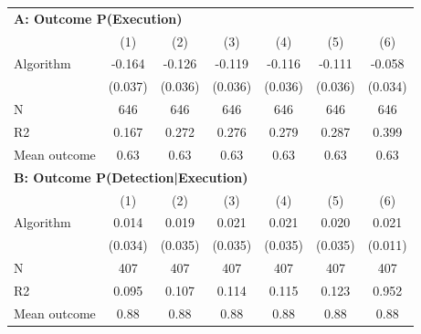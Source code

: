 \begin{tabular}{lcccccc} \toprule
\multicolumn{7}{l}{\textbf{A: Outcome P(Execution)}} \\ \multicolumn{1}{l}{} & (1) & (2) & (3) & (4) & (5) & (6) \\ \midrule
Algorithm   &      -0.164\sym{***}&      -0.126\sym{***}&      -0.119\sym{***}&      -0.116\sym{***}&      -0.111\sym{***}&      -0.058\sym{*}  \\
            &     (0.037)         &     (0.036)         &     (0.036)         &     (0.036)         &     (0.036)         &     (0.034)         \\
\midrule
N           &         646         &         646         &         646         &         646         &         646         &         646         \\
R2          &       0.167         &       0.272         &       0.276         &       0.279         &       0.287         &       0.399         \\
Mean outcome&        0.63         &        0.63         &        0.63         &        0.63         &        0.63         &        0.63         \\

\midrule \multicolumn{7}{l}{\textbf{B: Outcome P(Detection|Execution)}} \\ \multicolumn{1}{l}{} & (1) & (2) & (3) & (4) & (5) & (6) \\ \midrule
Algorithm   &       0.014         &       0.019         &       0.021         &       0.021         &       0.020         &       0.021\sym{**} \\
            &     (0.034)         &     (0.035)         &     (0.035)         &     (0.035)         &     (0.035)         &     (0.011)         \\
\midrule
N           &         407         &         407         &         407         &         407         &         407         &         407         \\
R2          &       0.095         &       0.107         &       0.114         &       0.115         &       0.123         &       0.952         \\
Mean outcome&        0.88         &        0.88         &        0.88         &        0.88         &        0.88         &        0.88         \\


\end{tabular}
